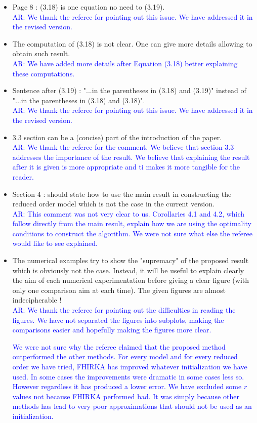\documentclass[11pt]{article}
\def\serkan#1{\textcolor{blue}{{#1}}}
\begin{document}
\begin{itemize}
\item Page 8 : (3.18) is one equation no need to (3.19). \\ [1ex]
\serkan{\textsf{AR}:  We thank the referee for pointing out this issue. We have addressed it in the revised version.}

\item The computation of (3.18) is not clear. One can give more details
allowing to obtain such result. \\ [1ex]
\serkan{\textsf{AR}:   We have added more details after Equation (3.18) better explaining these computations.}

\item Sentence after (3.19) : "...in the parentheses in (3.18) and (3.19)"
instead of "...in the parentheses in (3.18) and (3.18)". \\[1ex]
\serkan{\textsf{AR}:  We thank the referee for pointing out this issue. We have addressed it in the revised version.}

\item 3.3 section can be a (concise) part of the introduction of the paper. \\[1ex]
\serkan{\textsf{AR}:  We thank the referee for the comment.  We believe that section 3.3 addresses the importance of the result. We believe that explaining the result after it is given is more appropriate and ti makes it more tangible for the reader.}

\item Section 4 : should state how to use the main result in constructing
the reduced order model which is not the case in the current version.\\
\serkan{\textsf{AR}:  This comment was not very clear to us.  Corollaries 4.1 and 4.2, which follow directly from the main result, explain how we are using the optimality conditions to construct the algorithm.  We were not sure what else the referee would like to see explained.}

\item The numerical examples try to show the "supremacy" of the proposed
result which is obviously not the case. Instead, it will be useful to
explain clearly the aim of each numerical experimentation before giving
a clear figure (with only one comparison aim at each time). The given
figures are almost indecipherable !\\[1ex]
\serkan{\textsf{AR}:  We thank the referee for pointing out the difficulties in reading the figures. We have not separated the figures into subplots, making the comparisons easier and hopefully making the figures more clear.
}

\textcolor{blue}{
We were not sure why the referee claimed that the proposed method outperformed the other methods. For every model and for every reduced order we have tried, FHIRKA has improved whatever initialization we have used. In some cases the improvements were dramatic in some cases less so. However regardless it has produced a lower error. We have excluded some $r$ values not because FHIRKA performed bad. It was simply because other methods has lead to very poor approximations that should not be used as an initialization.}

\end{itemize}
\end{document}
